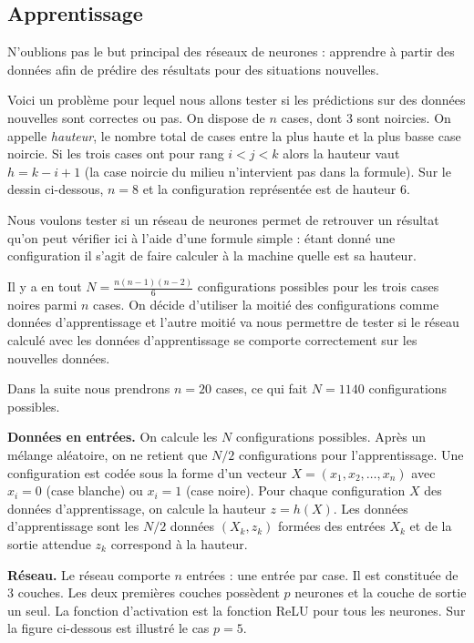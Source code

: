 {%
\subsection{Apprentissage}

N'oublions pas le but principal des réseaux de neurones : apprendre à partir des données afin de prédire des résultats pour des situations nouvelles.


Voici un problème pour lequel nous allons tester si les prédictions sur des données nouvelles sont correctes ou pas.
On dispose de $n$ cases, dont $3$ sont noircies.  On appelle \emph{hauteur}, le nombre total de cases entre la plus haute et la plus basse case noircie. Si les trois cases ont pour rang $i < j <k$ alors la hauteur vaut $h = k-i+1$ (la case noircie du milieu n'intervient pas dans la formule).
Sur le dessin ci-dessous, $n=8$ et la configuration représentée est de hauteur $6$.


Nous voulons tester si un réseau de neurones permet de retrouver un résultat qu'on peut vérifier ici à l'aide d'une formule simple :
étant donné une configuration il s'agit de faire calculer à la machine quelle est sa hauteur. 

Il y a en tout $N = \frac{n(n-1)(n-2)}{6}$ configurations possibles pour les trois cases noires parmi $n$ cases.
On décide d'utiliser la moitié des configurations comme données d'apprentissage et l'autre moitié va nous permettre de tester si le réseau calculé avec les données d'apprentissage se comporte \og{} correctement\fg{} sur les nouvelles données.

Dans la suite nous prendrons $n=20$ cases, ce qui fait $N=1140$ configurations possibles.

\textbf{Données en entrées.}
On calcule les $N$ configurations possibles. Après un mélange aléatoire, on ne retient que $N/2$ configurations pour l'apprentissage. Une configuration est codée sous la forme d'un vecteur
$X = (x_1,x_2,\ldots,x_n)$ avec $x_i=0$ (case blanche) ou $x_i = 1$ (case noire).
Pour chaque configuration $X$ des données d'apprentissage, on calcule la hauteur $z = h(X)$. Les données d'apprentissage sont les $N/2$ données $(X_k,z_k)$ formées des entrées $X_k$ et de la sortie attendue $z_k$ correspond à la hauteur. 

\textbf{Réseau.}
Le réseau comporte $n$ entrées : une entrée par case. Il est constituée de $3$ couches.
Les deux premières couches possèdent $p$ neurones et la couche de sortie un seul. La fonction d'activation est la fonction ReLU pour tous les neurones. Sur la figure ci-dessous est illustré le cas $p=5$.

}
